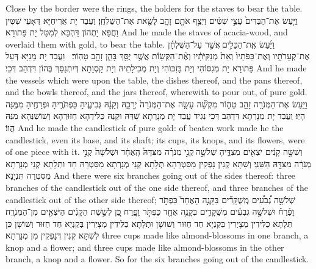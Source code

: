 {{Close by the border were the rings, the holders for the staves to bear the table.}{}
{וַיַּ֤עַשׂ אֶת־הַבַּדִּים֙ עֲצֵ֣י שִׁטִּ֔ים וַיְצַ֥ף אֹתָ֖ם זָהָ֑ב לָשֵׂ֖את אֶת־הַשֻּׁלְחָֽן׃}
{וַעֲבַד יָת אֲרִיחַיָּא דְּאָעֵי שִׁטִּין וַחֲפָא יָתְהוֹן דַּהְבָּא לְמִטַּל יָת פָּתוּרָא׃}
{And he made the staves of acacia-wood, and overlaid them with gold, to bear the table.}{}
{וַיַּ֜עַשׂ אֶֽת־הַכֵּלִ֣ים \legarmeh  אֲשֶׁ֣ר עַל־הַשֻּׁלְחָ֗ן אֶת־קְעָרֹתָ֤יו וְאֶת־כַּפֹּתָיו֙ וְאֵת֙ מְנַקִּיֹּתָ֔יו וְאֶ֨ת־הַקְּשָׂוֺ֔ת אֲשֶׁ֥ר יֻסַּ֖ךְ בָּהֵ֑ן זָהָ֖ב טָהֽוֹר׃ \petucha }
{וַעֲבַד יָת מָנַיָּא דְּעַל פָּתוּרָא יָת מְגִסּוֹהִי וְיָת בָּזִכּוֹהִי וְיָת מְכִילָתֵיהּ וְיָת קָסְוָתָא דְּיִתְנַסַּךְ בְּהוֹן דִּדְהַב דְּכֵי׃}
{And he made the vessels which were upon the table, the dishes thereof, and the pans thereof, and the bowls thereof, and the jars thereof, wherewith to pour out, of pure gold.}{}
{וַיַּ֥עַשׂ אֶת־הַמְּנֹרָ֖ה זָהָ֣ב טָה֑וֹר מִקְשָׁ֞ה עָשָׂ֤ה אֶת־הַמְּנֹרָה֙ יְרֵכָ֣הּ וְקָנָ֔הּ גְּבִיעֶ֛יהָ כַּפְתֹּרֶ֥יהָ וּפְרָחֶ֖יהָ מִמֶּ֥נָּה הָיֽוּ׃}
{וַעֲבַד יָת מְנָרְתָא דִּדְהַב דְּכֵי נְגִיד עֲבַד יָת מְנָרְתָא שִׁדַּהּ וּקְנַהּ כַּלִּידַהָא חַזּוּרַהָא וְשׁוֹשַׁנַּהָא מִנַּהּ הֲווֹ׃}
{And he made the candlestick of pure gold: of beaten work made he the candlestick, even its base, and its shaft; its cups, its knops, and its flowers, were of one piece with it.}{}
{וְשִׁשָּׁ֣ה קָנִ֔ים יֹצְאִ֖ים מִצִּדֶּ֑יהָ שְׁלֹשָׁ֣ה \legarmeh  קְנֵ֣י מְנֹרָ֗ה מִצִּדָּהּ֙ הָֽאֶחָ֔ד וּשְׁלֹשָׁה֙ קְנֵ֣י מְנֹרָ֔ה מִצִּדָּ֖הּ הַשֵּׁנִֽי׃}
{וְשִׁתָּא קְנִין נָפְקִין מִסִּטְרַהָא תְּלָתָא קְנֵי מְנָרְתָא מִסִּטְרַהּ חַד וּתְלָתָא קְנֵי מְנָרְתָא מִסִּטְרַהּ תִּנְיָנָא׃}
{And there were six branches going out of the sides thereof: three branches of the candlestick out of the one side thereof, and three branches of the candlestick out of the other side thereof;}{}
{שְׁלֹשָׁ֣ה גְ֠בִעִ֠ים מְֽשֻׁקָּדִ֞ים בַּקָּנֶ֣ה הָאֶחָד֮ כַּפְתֹּ֣ר וָפֶ֒רַח֒ וּשְׁלֹשָׁ֣ה גְבִעִ֗ים מְשֻׁקָּדִ֛ים בְּקָנֶ֥ה אֶחָ֖ד כַּפְתֹּ֣ר וָפָ֑רַח כֵּ֚ן לְשֵׁ֣שֶׁת הַקָּנִ֔ים הַיֹּצְאִ֖ים מִן־הַמְּנֹרָֽה׃}
{תְּלָתָא כַלִּידִין מְצָיְרִין בְּקַנְיָא חַד חַזּוּר וְשׁוֹשָׁן וּתְלָתָא כַלִּידִין מְצָיְרִין בְּקַנְיָא חַד חַזּוּר וְשׁוֹשָׁן כֵּן לְשִׁתָּא קְנִין דְּנָפְקִין מִן מְנָרְתָא׃}
{three cups made like almond-blossoms in one branch, a knop and a flower; and three cups made like almond-blossoms in the other branch, a knop and a flower. So for the six branches going out of the candlestick.}{}
}
